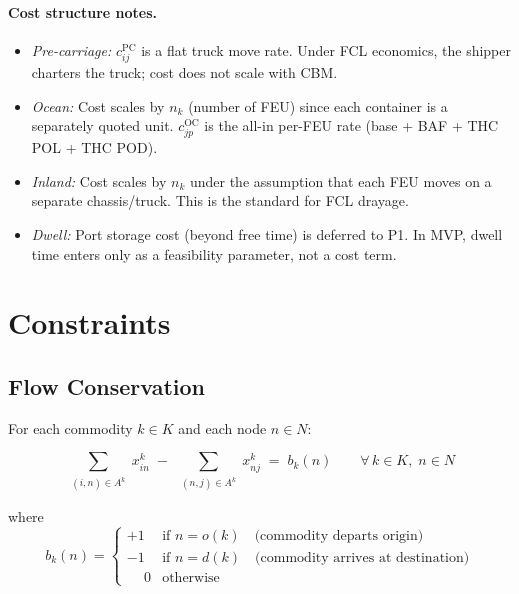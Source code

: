 \documentclass[11pt,a4paper]{article}
\theoremstyle{definition}
\begin{document}
\paragraph{Cost structure notes.}
\begin{itemize}[noitemsep]
  \item \textit{Pre-carriage:} $c_{ij}^{\text{PC}}$ is a flat truck move rate. Under FCL
        economics, the shipper charters the truck; cost does not scale with CBM.
  \item \textit{Ocean:} Cost scales by $n_k$ (number of FEU) since each container is a
        separately quoted unit. $c_{jp}^{\text{OC}}$ is the all-in per-FEU rate
        (base + BAF + THC POL + THC POD).
  \item \textit{Inland:} Cost scales by $n_k$ under the assumption that each FEU moves
        on a separate chassis/truck. This is the standard for FCL drayage.
  \item \textit{Dwell:} Port storage cost (beyond free time) is deferred to P1. In MVP,
        dwell time enters only as a feasibility parameter, not a cost term.
\end{itemize}

\section{Constraints}

\subsection{Flow Conservation}

For each commodity $k \in K$ and each node $n \in N$:

\begin{equation}
  \sum_{\substack{(i,n) \in A^k}} x_{in}^k \;-\; \sum_{\substack{(n,j) \in A^k}} x_{nj}^k \;=\; b_k(n)
  \qquad \forall\, k \in K,\; n \in N
  \label{eq:flow}
\end{equation}

where
\[
  b_k(n) = \begin{cases}
    +1 & \text{if } n = o(k) \quad \text{(commodity departs origin)} \\
    -1 & \text{if } n = d(k) \quad \text{(commodity arrives at destination)} \\
    \phantom{+}0 & \text{otherwise}
  \end{cases}
\]
\end{document}
